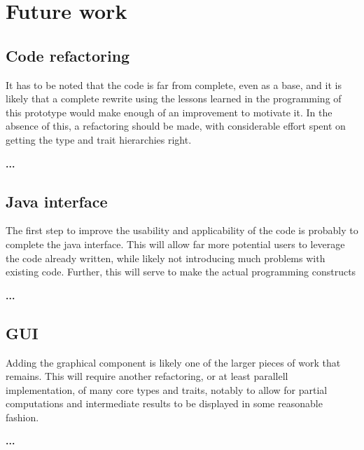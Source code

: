 \section{Future work}

\subsection{Code refactoring}

It has to be noted that the code is far from complete, even as a base, and
it is likely that a complete rewrite using the lessons learned in the
programming of this prototype would make enough of an improvement to
motivate it. In the absence of this, a refactoring should be made, with
considerable effort spent on getting the type and trait hierarchies right.

\textbf{...} %

\subsection{Java interface}

The first step to improve the usability and applicability of the code is
probably to complete the java interface. This will allow far more potential
users to leverage the code already written, while likely not introducing
much problems with existing code. Further, this will serve to make the
actual programming constructs  

\textbf{...} %

\subsection{GUI}

Adding the graphical component is likely one of the larger pieces of work
that remains. This will require another refactoring, or at least parallell
implementation, of many core types and traits, notably to allow for partial
computations and intermediate results to be displayed in some reasonable
fashion.

\textbf{...} %

